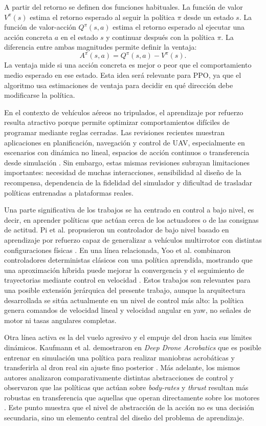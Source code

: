A partir del retorno se definen dos funciones habituales. La función de valor
$V^{\pi}(s)$ estima el retorno esperado al seguir la política $\pi$ desde un estado
$s$. La función de valor-acción $Q^{\pi}(s,a)$ estima el retorno esperado al ejecutar
una acción concreta $a$ en el estado $s$ y continuar después con la política $\pi$.
La diferencia entre ambas magnitudes permite definir la ventaja:
\[
    A^{\pi}(s,a) = Q^{\pi}(s,a) - V^{\pi}(s).
\]
La ventaja mide si una acción concreta es mejor o peor que el comportamiento medio
esperado en ese estado. Esta idea será relevante para PPO, ya que el algoritmo usa
estimaciones de ventaja para decidir en qué dirección debe modificarse la política.

En el contexto de vehículos aéreos no tripulados, el aprendizaje por refuerzo resulta
atractivo porque permite optimizar comportamientos difíciles de programar mediante
reglas cerradas. Las revisiones recientes muestran aplicaciones en planificación,
navegación y control de UAV, especialmente en escenarios con dinámica no lineal,
espacios de acción continuos o transferencia desde simulación \cite{azar2021drone_review,
chan2024drone_simulators}. Sin embargo, estas mismas revisiones subrayan
limitaciones importantes: necesidad de muchas interacciones, sensibilidad al diseño
de la recompensa, dependencia de la fidelidad del simulador y dificultad de trasladar
políticas entrenadas a plataformas reales.

Una parte significativa de los trabajos se ha centrado en control a bajo nivel, es
decir, en aprender políticas que actúan cerca de los actuadores o de las consignas de
actitud. Pi et al. propusieron un controlador de bajo nivel basado en aprendizaje por
refuerzo capaz de generalizar a vehículos multirrotor con distintas configuraciones
físicas \cite{pi2021lowlevel}. En una línea relacionada, Yoo et al. combinaron
controladores deterministas clásicos con una política aprendida, mostrando que una
aproximación híbrida puede mejorar la convergencia y el seguimiento de trayectorias
mediante control en velocidad \cite{yoo2021hybrid}. Estos trabajos son relevantes
para una posible extensión jerárquica del presente trabajo, aunque la arquitectura
desarrollada se sitúa actualmente en un nivel de control más alto: la política genera
comandos de velocidad lineal y velocidad angular en yaw, no señales de motor ni
tasas angulares completas.

Otra línea activa es la del vuelo agresivo y el empuje del dron hacia sus límites
dinámicos. Kaufmann et al. demostraron en \emph{Deep Drone Acrobatics} que es
posible entrenar en simulación una política para realizar maniobras acrobáticas y
transferirla al dron real sin ajuste fino posterior \cite{kaufmann2020acrobatics}.
Más adelante, los mismos autores analizaron comparativamente distintas abstracciones
de control y observaron que las políticas que actúan sobre \emph{body-rates} y
\emph{thrust} resultan más robustas en transferencia que aquellas que operan
directamente sobre los motores \cite{kaufmann2022benchmark}. Este punto muestra
que el nivel de abstracción de la acción no es una decisión secundaria, sino un
elemento central del diseño del problema de aprendizaje.

